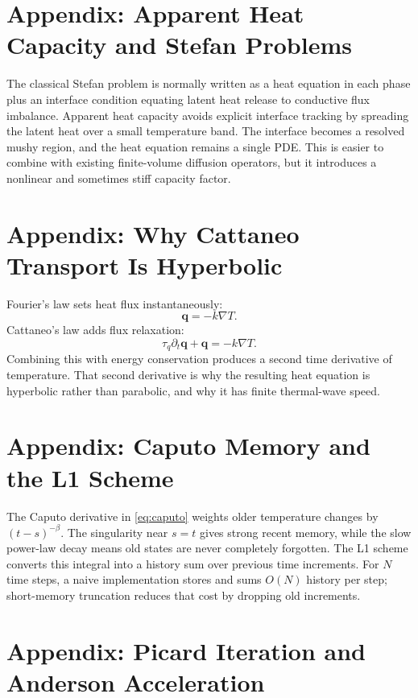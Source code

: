 \documentclass[11pt]{article}
\numberwithin{equation}{section}
\begin{document}
\appendix

\section{Appendix: Apparent Heat Capacity and Stefan Problems}

The classical Stefan problem is normally written as a heat equation in each
phase plus an interface condition equating latent heat release to conductive
flux imbalance.  Apparent heat capacity avoids explicit interface tracking by
spreading the latent heat over a small temperature band.  The interface becomes
a resolved mushy region, and the heat equation remains a single PDE.  This is
easier to combine with existing finite-volume diffusion operators, but it
introduces a nonlinear and sometimes stiff capacity factor.

\section{Appendix: Why Cattaneo Transport Is Hyperbolic}

Fourier's law sets heat flux instantaneously:
\begin{equation}
  \bm{q} = -k\nabla T.
\end{equation}
Cattaneo's law adds flux relaxation:
\begin{equation}
  \tau_q \partial_t \bm{q} + \bm{q} = -k\nabla T.
\end{equation}
Combining this with energy conservation produces a second time derivative of
temperature.  That second derivative is why the resulting heat equation is
hyperbolic rather than parabolic, and why it has finite thermal-wave speed.

\section{Appendix: Caputo Memory and the L1 Scheme}

The Caputo derivative in \eqref{eq:caputo} weights older temperature changes by
$(t-s)^{-\beta}$.  The singularity near $s=t$ gives strong recent memory, while
the slow power-law decay means old states are never completely forgotten.  The
L1 scheme converts this integral into a history sum over previous time
increments.  For $N$ time steps, a naive implementation stores and sums
$O(N)$ history per step; short-memory truncation reduces that cost by dropping
old increments.

\section{Appendix: Picard Iteration and Anderson Acceleration}
\end{document}
